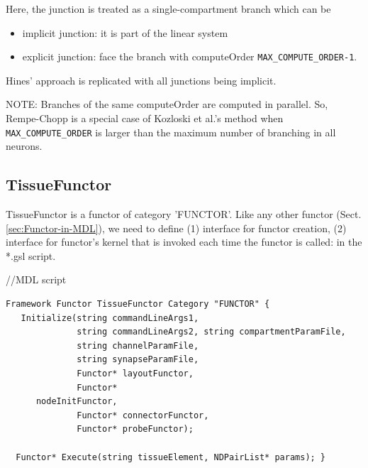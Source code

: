 \begin{enumerate}
\begin{itemize}
   \end{itemize}
    
    Here, the junction is treated as a single-compartment branch which can be 
    \begin{itemize}
      \item implicit junction: it is part of the linear system
      
      \item explicit junction: face the branch with computeOrder
      \verb!MAX_COMPUTE_ORDER-1!.
    \end{itemize}
Hines' approach is replicated with all junctions being implicit.

%    
% 
% 
%     
   NOTE: Branches of the same computeOrder are computed in parallel.
So, Rempe-Chopp is a special case of Kozloski et al.'s method when
\verb!MAX_COMPUTE_ORDER! is larger than the maximum number of branching in all
neurons.
    
\end{enumerate}


\subsection{TissueFunctor}
\label{sec:TissueFunctor.mdl}

TissueFunctor is a functor of category 'FUNCTOR'. Like any other functor
(Sect.\ref{sec:Functor-in-MDL}), we need to define (1) interface for functor
creation, (2) interface for functor's kernel that is invoked each time the
functor is called:
in the *.gsl script.

//MDL script
\begin{verbatim}
Framework Functor TissueFunctor Category "FUNCTOR" {
   Initialize(string commandLineArgs1, 
              string commandLineArgs2, string compartmentParamFile, 
              string channelParamFile, 
              string synapseParamFile, 
              Functor* layoutFunctor, 
              Functor*
      nodeInitFunctor, 
              Functor* connectorFunctor, 
              Functor* probeFunctor); 
              
  Functor* Execute(string tissueElement, NDPairList* params); }
\end{verbatim}

